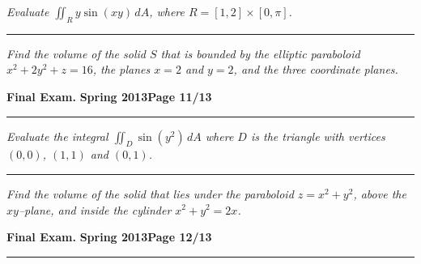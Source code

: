 \documentclass[12pt]{article}
\begin{document}
\bigskip
{\problem[15 pts] \em  Evaluate $\iint_R y \sin(xy)\, dA$, where
  $R=[1,2] \times [0,\pi]$.}
\vspace{8cm}
\begin{flushright}
\end{flushright}
\hrule
{\problem[15 pts] \em Find the volume of the solid $S$ that is bounded
  by the elliptic paraboloid $x^2+2y^2+z=16$, the planes $x=2$ and
  $y=2$, and the three coordinate planes.}
\vspace{9cm}
\begin{flushright}
\end{flushright}
\newpage

\hfill{\large\bf Final Exam.}\hfill{\large\bf
  Spring 2013}\hfill{\large\bf Page 11/13}\hrule

\bigskip
{\problem[15 pts] \em Evaluate the integral $\iint_D \sin(y^2)\, dA$
  where $D$ is the triangle with vertices $(0,0)$, $(1,1)$ and
  $(0,1)$.}
\vspace{8cm}
\begin{flushright}
\end{flushright}
\hrule
{\problem[10 pts] \em Find the volume of the solid that lies under the
  paraboloid $z=x^2+y^2$, above the $xy$--plane, and inside the
  cylinder $x^2+y^2=2x$.}
\vspace{8cm}
\begin{flushright}
\end{flushright}
\newpage

\hfill{\large\bf Final Exam.}\hfill{\large\bf
  Spring 2013}\hfill{\large\bf Page 12/13}\hrule
\end{document}
